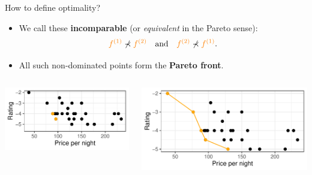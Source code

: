 \documentclass[11pt,compress,t,notes=noshow,xcolor=table]{beamer}
\begin{document}
\begin{vbframe}{How to define optimality?}


\begin{itemize}\setlength{\itemsep}{0.1em}
  \item We call these \textbf{incomparable} (or \emph{equivalent} in the Pareto sense):
\[
\textcolor{orange}{f^{(1)}} 
   \not\prec 
\textcolor{orange}{f^{(2)}} 
\quad\text{and}\quad
\textcolor{orange}{f^{(2)}} 
   \not\prec 
\textcolor{orange}{f^{(1)}}.
\]
\item All such non-dominated points form the \textbf{Pareto front}.
\end{itemize}

\bigskip
\begin{columns}[c]
        \includegraphics[width=\textwidth]{slides/11-multicrit/figure_man/expedia-4-1.pdf}
        
        \includegraphics[width=\textwidth]{slides/11-multicrit/figure_man/expedia-5-1.pdf}
    \end{columns}

\end{vbframe}
\end{document}
